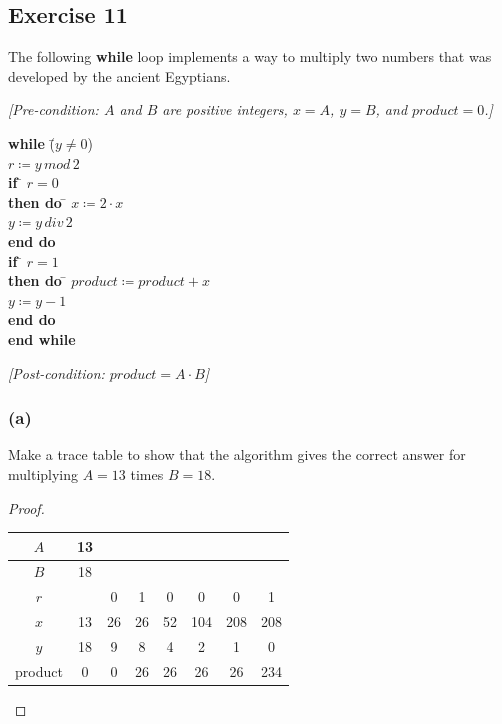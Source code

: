 \documentclass[14pt]{extarticle}
\begin{document}
\subsection{Exercise 11}
The following {\bf while} loop implements a way to multiply two numbers that was developed by the ancient Egyptians.

{\it [Pre-condition: $A$ and $B$ are positive integers, $x = A$,  $y = B$, and $product = 0$.]}

\begin{tabbing}
{\bf while} \= ($y \neq 0$) \\
\> $r \coloneqq y \, mod \, 2$ \\
\> {\bf if} \= $r = 0$ \\
\>          \> {\bf then do} \= $x \coloneqq 2 \cdot x$ \\
\>          \>               \> $y \coloneqq y \, div \, 2$ \\
\>          \>               \> {\bf end do} \\
\> {\bf if} \= $r = 1$ \\
\>          \> {\bf then do} \= $product \coloneqq product + x$ \\
\>          \>               \> $y \coloneqq y - 1$ \\
\>          \>               \> {\bf end do} \\
{\bf end while} 
\end{tabbing}

{\it [Post-condition: $product = A \cdot B$]}

\subsubsection{(a)}
Make a trace table to show that the algorithm gives the correct answer for multiplying $A = 13$ times $B = 18$.

\begin{proof}
\begin{center}
\begin{tabular}{|c|c|c|c|c|c|c|c|}
\hline
$A$ & 13 & & & & & & \\
\hline
$B$ & 18 & & & & & & \\
\hline
$r$ &    & 0 & 1 & 0 & 0 & 0 & 1   \\
\hline
$x$ & 13 & 26& 26& 52&104&208& 208 \\
\hline
$y$ & 18 & 9 & 8 & 4 & 2 & 1 & 0   \\
\hline
product&0& 0 & 26& 26& 26& 26& 234 \\
\hline
\end{tabular}
\end{center}
\end{proof}
\end{document}
